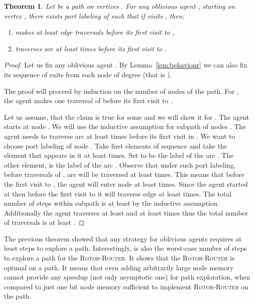 \documentclass{article}[11pt,letter]
\newtheorem{theorem}[definition]{Theorem}
\newtheorem{theorem}[definition]{Theorem}
\newcommand{\RR}{{\textsc{Rotor-Router}}\xspace}
\begin{document}
\begin{theorem}
\label{thm:path}
Let  be a path on  vertices . For any oblivious agent , starting on vertex , there exists port labeling of  such that if  visits , then:
\begin{enumerate}
\item \label{path1}  makes at least  edge traversals before its first visit to ,
\item \label{path2}  traverses arc  at least  times before its first visit to .
\end{enumerate}
\end{theorem}
\begin{proof}
Let us fix any oblivious agent . By Lemma~\ref{lem:behaviour} we can also fix its sequence  of exits from each node of degree  (that is ).

The proof will proceed by induction on the number of nodes of the path. For , the agent makes one traversal of  before its first visit to . 

Let us assume, that the claim is true for some  and we will show it for . The agent starts at node . We will use the inductive assumption for subpath of nodes . The agent needs to traverse arc  at least  times before its first visit in . We want to choose port labeling of node . Take first  elements of sequence  and take the element  that appears in it at least  times. 
Set  to be the label of the arc . The other element,  is the label of the arc . Observe that under such port labeling, before  traversals of , arc  will be traversed at least  times. This means that before the first visit to , the agent will enter node  at least  times. Since the agent started at  then before the first visit to  it will traverse edge  at least  times. The total number of steps within subpath  is at least  by the inductive assumption. Additionally the agent traverses  at least  and  at least  times thus the total number of traversals is at least .
\end{proof}
The previous theorem showed that any strategy for oblivious agents requires at least  steps to explore a path. Interestingly,  is also the worst-case number of steps to explore a path for the \RR. It shows that the \RR is optimal on a path. It means that even adding arbitrarily large node memory cannot provide any speedup (not only asymptotic one) for path exploration, when compared to just one bit node memory sufficient to implement \RR on the path.
\end{document}
